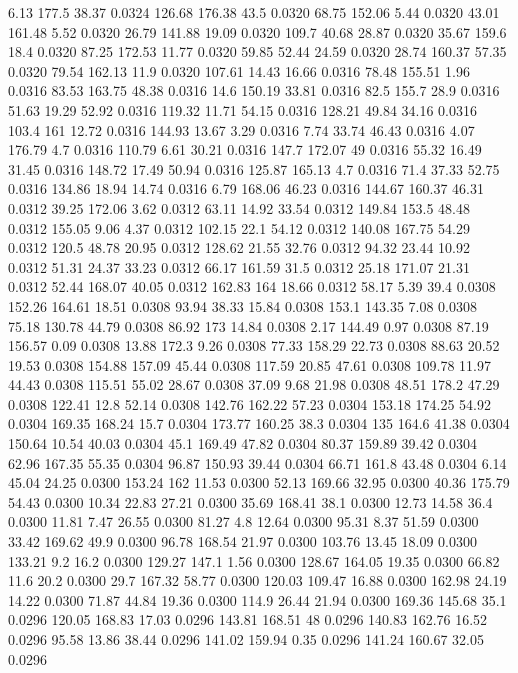 6.13	177.5	38.37	0.0324
126.68	176.38	43.5	0.0320
68.75	152.06	5.44	0.0320
43.01	161.48	5.52	0.0320
26.79	141.88	19.09	0.0320
109.7	40.68	28.87	0.0320
35.67	159.6	18.4	0.0320
87.25	172.53	11.77	0.0320
59.85	52.44	24.59	0.0320
28.74	160.37	57.35	0.0320
79.54	162.13	11.9	0.0320
107.61	14.43	16.66	0.0316
78.48	155.51	1.96	0.0316
83.53	163.75	48.38	0.0316
14.6	150.19	33.81	0.0316
82.5	155.7	28.9	0.0316
51.63	19.29	52.92	0.0316
119.32	11.71	54.15	0.0316
128.21	49.84	34.16	0.0316
103.4	161	12.72	0.0316
144.93	13.67	3.29	0.0316
7.74	33.74	46.43	0.0316
4.07	176.79	4.7	0.0316
110.79	6.61	30.21	0.0316
147.7	172.07	49	0.0316
55.32	16.49	31.45	0.0316
148.72	17.49	50.94	0.0316
125.87	165.13	4.7	0.0316
71.4	37.33	52.75	0.0316
134.86	18.94	14.74	0.0316
6.79	168.06	46.23	0.0316
144.67	160.37	46.31	0.0312
39.25	172.06	3.62	0.0312
63.11	14.92	33.54	0.0312
149.84	153.5	48.48	0.0312
155.05	9.06	4.37	0.0312
102.15	22.1	54.12	0.0312
140.08	167.75	54.29	0.0312
120.5	48.78	20.95	0.0312
128.62	21.55	32.76	0.0312
94.32	23.44	10.92	0.0312
51.31	24.37	33.23	0.0312
66.17	161.59	31.5	0.0312
25.18	171.07	21.31	0.0312
52.44	168.07	40.05	0.0312
162.83	164	18.66	0.0312
58.17	5.39	39.4	0.0308
152.26	164.61	18.51	0.0308
93.94	38.33	15.84	0.0308
153.1	143.35	7.08	0.0308
75.18	130.78	44.79	0.0308
86.92	173	14.84	0.0308
2.17	144.49	0.97	0.0308
87.19	156.57	0.09	0.0308
13.88	172.3	9.26	0.0308
77.33	158.29	22.73	0.0308
88.63	20.52	19.53	0.0308
154.88	157.09	45.44	0.0308
117.59	20.85	47.61	0.0308
109.78	11.97	44.43	0.0308
115.51	55.02	28.67	0.0308
37.09	9.68	21.98	0.0308
48.51	178.2	47.29	0.0308
122.41	12.8	52.14	0.0308
142.76	162.22	57.23	0.0304
153.18	174.25	54.92	0.0304
169.35	168.24	15.7	0.0304
173.77	160.25	38.3	0.0304
135	164.6	41.38	0.0304
150.64	10.54	40.03	0.0304
45.1	169.49	47.82	0.0304
80.37	159.89	39.42	0.0304
62.96	167.35	55.35	0.0304
96.87	150.93	39.44	0.0304
66.71	161.8	43.48	0.0304
6.14	45.04	24.25	0.0300
153.24	162	11.53	0.0300
52.13	169.66	32.95	0.0300
40.36	175.79	54.43	0.0300
10.34	22.83	27.21	0.0300
35.69	168.41	38.1	0.0300
12.73	14.58	36.4	0.0300
11.81	7.47	26.55	0.0300
81.27	4.8	12.64	0.0300
95.31	8.37	51.59	0.0300
33.42	169.62	49.9	0.0300
96.78	168.54	21.97	0.0300
103.76	13.45	18.09	0.0300
133.21	9.2	16.2	0.0300
129.27	147.1	1.56	0.0300
128.67	164.05	19.35	0.0300
66.82	11.6	20.2	0.0300
29.7	167.32	58.77	0.0300
120.03	109.47	16.88	0.0300
162.98	24.19	14.22	0.0300
71.87	44.84	19.36	0.0300
114.9	26.44	21.94	0.0300
169.36	145.68	35.1	0.0296
120.05	168.83	17.03	0.0296
143.81	168.51	48	0.0296
140.83	162.76	16.52	0.0296
95.58	13.86	38.44	0.0296
141.02	159.94	0.35	0.0296
141.24	160.67	32.05	0.0296
